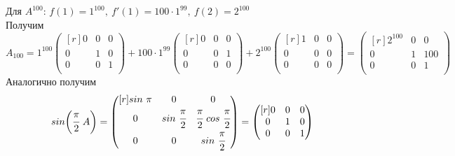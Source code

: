 \documentclass[12pt]{article}
\theoremstyle{definition}
\numberwithin{equation}{section}
\begin{document}
	Для $A^{100}$: $f(1)=1^{100},~f'(1)=100\cdot 1^{99},~f(2)=2^{100}$\\
	Получим
	\[A_{100}=1^{100}\begin{pmatrix}[r]
	0 & 0 & 0 \\
	0 & 1 & 0 \\
	0 & 0 & 1 \\
	\end{pmatrix} + 100\cdot 1^{99}\begin{pmatrix}[r]
	0 & 0 & 0 \\
	0 & 0 & 1 \\
	0 & 0 & 0 \\
	\end{pmatrix} + 2^{100}\begin{pmatrix}[r]
	1 & 0 & 0 \\
	0 & 0 & 0 \\
	0 & 0 & 0 \\
	\end{pmatrix} = \begin{pmatrix}[r]
	2^{100} & 0 & 0 \\
	0 & 1 & 100 \\
	0 & 0 & 1 \\
	\end{pmatrix}\]
	Аналогично получим
	\[sin\bigg(\cfrac{\pi}{2}~A\bigg)=\begin{pmatrix}[r]
	sin~\pi & 0 & 0 \\
	0 & sin~\cfrac{\pi}{2} & \cfrac{\pi}{2}~cos~\cfrac{\pi}{2} \\
	0 & 0 & sin~\cfrac{\pi}{2} \\
	\end{pmatrix} = \begin{pmatrix}[r]
	0 & 0 & 0 \\
	0 & 1 & 0 \\
	0 & 0 & 1 \\
	\end{pmatrix}\]
\end{document}
